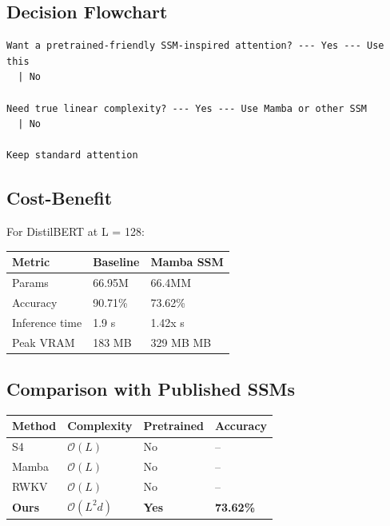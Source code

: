 \subsection{Decision Flowchart}

\begin{lstlisting}
Want a pretrained-friendly SSM-inspired attention? --- Yes --- Use this
  | No
   
Need true linear complexity? --- Yes --- Use Mamba or other SSM
  | No
   
Keep standard attention
\end{lstlisting}

\subsection{Cost-Benefit}

For DistilBERT at L = 128:

\begin{table}[H]
\centering
\small
\begin{tabular}{lll}
\toprule
\textbf{Metric} & \textbf{Baseline} & \textbf{Mamba SSM} \\
\midrule
Params & 66.95M & 66.4MM \\
Accuracy & 90.71\% & 73.62\% \\
Inference time & 1.9 s & 1.42x s \\
Peak VRAM & 183 MB & 329 MB MB \\
\bottomrule
\end{tabular}
\end{table}

\subsection{Comparison with Published SSMs}

\begin{table}[H]
\centering
\small
\begin{tabular}{llll}
\toprule
\textbf{Method} & \textbf{Complexity} & \textbf{Pretrained} & \textbf{Accuracy} \\
\midrule
S4 & $\mathcal{O}(L)$ & No & -- \\
Mamba & $\mathcal{O}(L)$ & No & -- \\
RWKV & $\mathcal{O}(L)$ & No & -- \\
\textbf{Ours} & $\mathcal{O}(L^2 d)$ & \textbf{Yes} & \textbf{73.62\%} \\
\bottomrule
\end{tabular}
\end{table}

